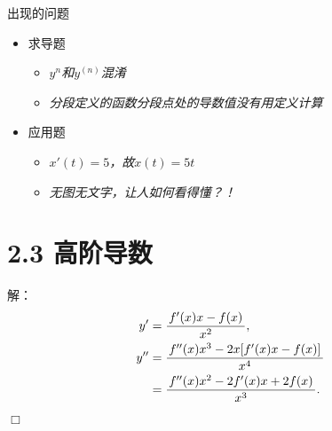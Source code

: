 
\titlepage


\begin{frame}{出现的问题}
	\linespread{1.5}
	  \begin{itemize}[<+-|alert@+>]
	    \item 求导题
	    \begin{itemize}
	      \item \b\it $y^n$和$y^{(n)}$混淆
	      \item \b\it 分段定义的函数分段点处的导数值没有用定义计算
	    \end{itemize}
	    \item 应用题
	    \begin{itemize}
	      \item \b\it $x'(t)=5$，故$x(t)=5t$ \ba{$\times$}
	      \item \b\it 无图无文字，让人如何看得懂？！
	    \end{itemize}
	  \end{itemize}
\end{frame}

\section{2.3 高阶导数}

\begin{frame}
	\linespread{1.5}
	\pause
	
	
	解：\it
	\begin{align*}
		y'&=\displaystyle\frac{\,{f'(x)x-f(x)}\,}{\,{x^2}\,},\\
		y''&=\displaystyle\frac{\,{f''(x)x^3-2x[f'(x)x-f(x)]}\,}{\,{x^4}\,}\\
		&=\displaystyle\frac{\,{f''(x)x^2-2f'(x)x+2f(x)}\,}{\,{x^3}\,}.
	\end{align*}
	\hfill$\Box$
\end{frame}

